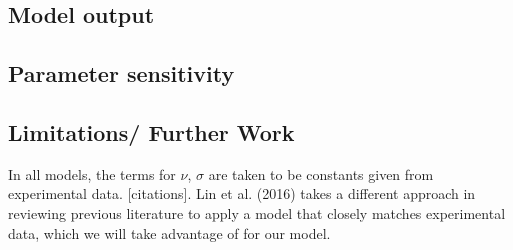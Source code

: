 \documentclass[12pt]{article}
\begin{document}
\begin{multicols}{2}
\subsection{Model output}
\lipsum[6]

\subsection{Parameter sensitivity}
\lipsum[7]




\subsection{Limitations/ Further Work}
\lipsum[8]

In all models, the terms for $\nu$, $\sigma$ are taken to be constants given from experimental data. [citations]. Lin et al. (2016) takes a different approach in reviewing previous literature to apply a model that closely matches experimental data, which we will take advantage of for our model.  

\end{multicols}
\printbibliography
\end{document}
